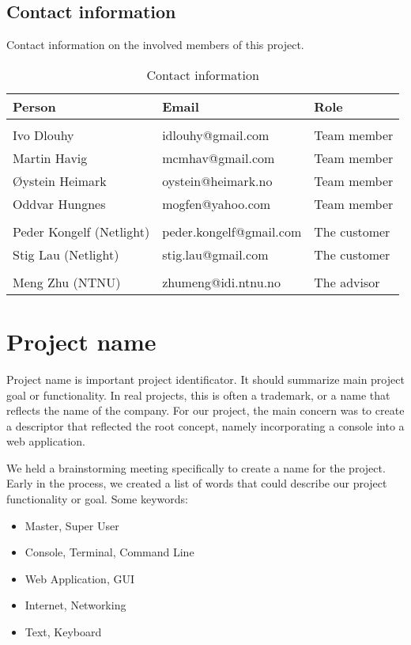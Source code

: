 \subsection{Contact information}
Contact information on the involved members of this project.
\begin{table}
\centering
\caption{Contact information}
\begin{tabular}{ l  l  l  }
 \textbf{Person} & \textbf{Email} & \textbf{Role} \\
\hline \\[-2.0ex]
 Ivo Dlouhy & idlouhy@gmail.com & Team member \\
 Martin Havig & mcmhav@gmail.com & Team member \\
 Øystein Heimark & oystein@heimark.no & Team member \\
 Oddvar Hungnes & mogfen@yahoo.com & Team member \\
\hline \\[-2.0ex]
 Peder Kongelf (Netlight) & peder.kongelf@gmail.com & The customer \\
 Stig Lau (Netlight) & stig.lau@gmail.com & The customer \\
\hline \\[-2.0ex]
  Meng Zhu (NTNU) & zhumeng@idi.ntnu.no & The advisor \\
\hline
\end{tabular}
\end{table}

\section{Project name}
Project name is important project identificator. It should summarize main project goal or functionality. In real projects, this is often a trademark, or a name that reflects the name of the company. For our project, the main concern was to create a descriptor that reflected the root concept, namely incorporating a console into a web application.

We held a brainstorming meeting specifically to create a name for the project. Early in the process, we created a list of words that could describe our project functionality or goal. Some keywords:
\begin{itemize}
\item Master, Super User
\item Console, Terminal, Command Line
\item Web Application, GUI
\item Internet, Networking
\item Text, Keyboard
\end{itemize}

